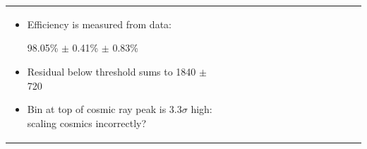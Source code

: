 \documentclass[landscape]{article}
\begin{document}
\begin{tabular}{p{0.6\linewidth} p{0.4\linewidth}}
\begin{minipage}{1.1\linewidth}
    \begin{itemize}

      \item Efficiency is measured from data:
\begin{center} 98.05\% $\pm$ 0.41\% $\pm$ 0.83\% \end{center}

\vspace{1 cm}
      \item Residual below threshold sums to 1840 $\pm$ 720

\vspace{1 cm}
      \item Bin at top of cosmic ray peak is 3.3$\sigma$ high: scaling
      cosmics incorrectly?

    \end{itemize}

  \end{minipage} \\
\end{tabular}
\end{document}
